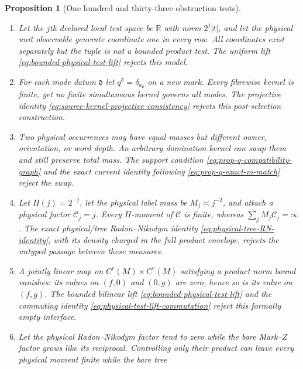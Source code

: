 \documentclass[11pt]{article}
\newtheorem{proposition}[theorem]{Proposition}
\begin{document}
\begin{proposition}[One hundred and thirty-three obstruction tests]
\begin{enumerate}[label=\textup{(T\arabic*)}]
      $\sum_jq_j\int|U_j^*1|\,d\nu_j=\infty$.  The occurrencewise definition
      \eqref{eq:marked-source-assembled-pairing} makes the grouped scalar
      integral legitimate, while $\mathrm{POST\_CARRIER\_DOM}$ forbids any
      subsequent carrier restriction not controlled by positive variation.
\item Let the $j$th declared local test space be $\mathbb R$ with norm
      $2^j|t|$, and let the physical unit observable generate coordinate
      one in every row.  All coordinates exist separately but the tuple is
      not a bounded product test.  The uniform lift
      \eqref{eq:bounded-physical-test-lift} rejects this model.
\item For each mode datum $\mathfrak d$ let
      $q^{\mathfrak d}=\delta_{a_{\mathfrak d}}$ on a new mark.  Every
      fibrewise kernel is finite, yet no finite simultaneous kernel governs
      all modes.  The projective identity
      \eqref{eq:source-kernel-projective-consistency} rejects this
      post-selection construction.
\item Two physical occurrences may have equal masses but different owner,
      orientation, or word depth.  An arbitrary domination kernel can swap
      them and still preserve total mass.  The support condition
      \eqref{eq:prop-q-compatibility-graph} and the exact current identity
      following \eqref{eq:prop-q-exact-m-match} reject the swap.
\item Let $\Pi(j)=2^{-j}$, let the physical label mass be
      $M_j\asymp j^{-2}$, and attach a physical factor $\mathcal C_j=j$.
      Every $\Pi$-moment of $\mathcal C$ is finite, whereas
      $\sum_jM_j\mathcal C_j=\infty$.  The exact physical/tree
      Radon--Nikodym identity \eqref{eq:physical-tree-RN-identity}, with its
      density charged in the full product envelope, rejects the untyped
      passage between these measures.
\item A jointly linear map on
      $C^r(M)\times C^r(M)$ satisfying a product norm bound vanishes: its
      values on $(f,0)$ and $(0,g)$ are zero, hence so is its value on
      $(f,g)$.  The bounded \emph{bilinear} lift
      \eqref{eq:bounded-physical-test-lift} and the commuting identity
      \eqref{eq:physical-test-lift-commutation} reject this formally empty
      interface.
\item Let the physical Radon--Nikodym factor tend to zero while the bare
      Mark--$Z$ factor grows like its reciprocal.  Controlling only their
      product can leave every physical moment finite while the bare tree

\end{enumerate}
\end{proposition}
\end{document}
